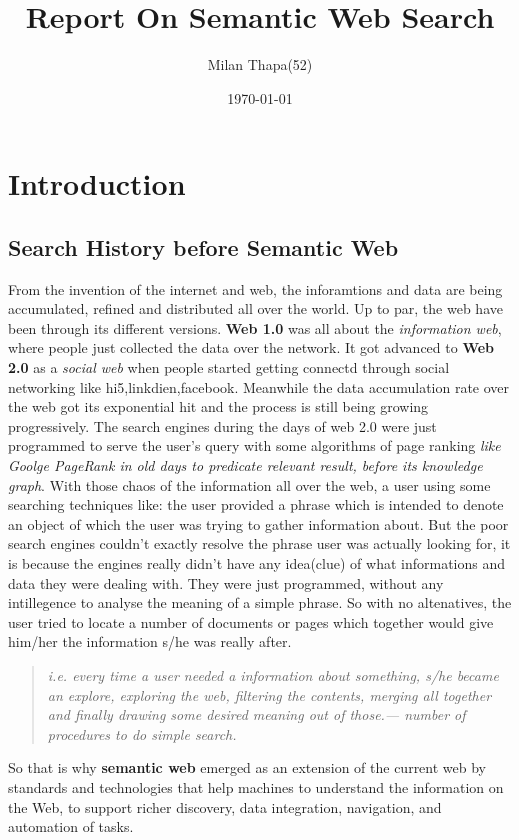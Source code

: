 \documentclass[12pt,a4]{article}
\title{Report On Semantic Web Search}
\author{Milan Thapa(52)}
\date{\today}
\begin{document}

\clearpage
{}
\setcounter{page}{2}
\tableofcontents
\newpage
\section{Introduction}
\subsection{Search History before Semantic Web}
From the invention of the internet and web, the inforamtions and data are being accumulated, refined and distributed all over the world. Up to par, the web have been through its different versions. \textbf{Web 1.0} was all about the \textit{information web}, where people just collected the data over the network. It got advanced to \textbf{Web 2.0} as a \textit{social web} when people started getting connectd through social networking like hi5,linkdien,facebook. Meanwhile the data accumulation rate over the web got its exponential hit and the process is still being growing progressively. The search engines during the days of web 2.0  were just programmed to serve the user's query with some algorithms of page ranking \textit{like Goolge PageRank in old days to predicate relevant result, before its knowledge graph}. With those chaos of the information all over the web, a user using some searching techniques like: the user provided a phrase which is intended to denote an object of which the user was trying to gather information about. But the poor search engines couldn't exactly resolve the phrase user was actually looking for, it is because the engines really didn't have any idea(clue) of what informations and data they were dealing with. They were just programmed, without any intillegence to analyse the meaning of a simple phrase. So with no altenatives, the user tried to locate a number of documents or pages which together would give him/her the information s/he was really after.\begin{quote}\textit{i.e. every time a user needed a information about something, s/he became an explore, exploring the web, filtering the contents, merging all together and finally drawing some desired meaning out of those.--- number of procedures to do simple search.}\end{quote}
So that is why \textbf{semantic web} emerged as an extension of the current web by standards and technologies that help machines to understand the information on the Web, to support richer discovery, data integration, navigation, and automation of tasks.
\clearpage
\end{document}
